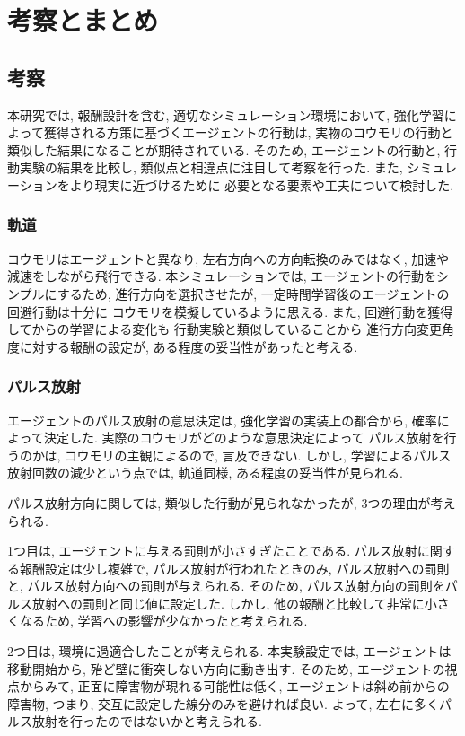 \documentclass[../main]{subfiles}
\begin{document}
\newpage
\chapter{考察とまとめ}
\label{chap:result}

\section{考察}
本研究では, 報酬設計を含む, 適切なシミュレーション環境において, 
強化学習によって獲得される方策に基づくエージェントの行動は, 
実物のコウモリの行動と類似した結果になることが期待されている.
そのため, エージェントの行動と, 行動実験の結果を比較し, 
類似点と相違点に注目して考察を行った. 
また, シミュレーションをより現実に近づけるために
必要となる要素や工夫について検討した.


\subsection{軌道}
コウモリはエージェントと異なり, 
左右方向への方向転換のみではなく, 
加速や減速をしながら飛行できる.
本シミュレーションでは, エージェントの行動をシンプルにするため, 
進行方向を選択させたが, 
一定時間学習後のエージェントの回避行動は十分に
コウモリを模擬しているように思える.
また, 回避行動を獲得してからの学習による変化も
行動実験と類似していることから
進行方向変更角度に対する報酬の設定が,
ある程度の妥当性があったと考える.


\subsection{パルス放射}
エージェントのパルス放射の意思決定は, 
強化学習の実装上の都合から, 
確率によって決定した.
実際のコウモリがどのような意思決定によって 
パルス放射を行うのかは, 
コウモリの主観によるので, 言及できない.
しかし, 学習によるパルス放射回数の減少という点では, 
軌道同様, ある程度の妥当性が見られる.

パルス放射方向に関しては, 
類似した行動が見られなかったが, 
3つの理由が考えられる.

1つ目は, エージェントに与える罰則が小さすぎたことである.
パルス放射に関する報酬設定は少し複雑で, 
パルス放射が行われたときのみ, 
パルス放射への罰則と, パルス放射方向への罰則が与えられる.
そのため, パルス放射方向の罰則をパルス放射への罰則と同じ値に設定した.
しかし, 他の報酬と比較して非常に小さくなるため, 
学習への影響が少なかったと考えられる.

2つ目は, 環境に過適合したことが考えられる.
本実験設定では, エージェントは移動開始から, 
殆ど壁に衝突しない方向に動き出す.
そのため, エージェントの視点からみて, 
正面に障害物が現れる可能性は低く, 
エージェントは斜め前からの障害物, つまり, 
交互に設定した線分のみを避ければ良い.
よって, 左右に多くパルス放射を行ったのではないかと考えられる.
\end{document}
